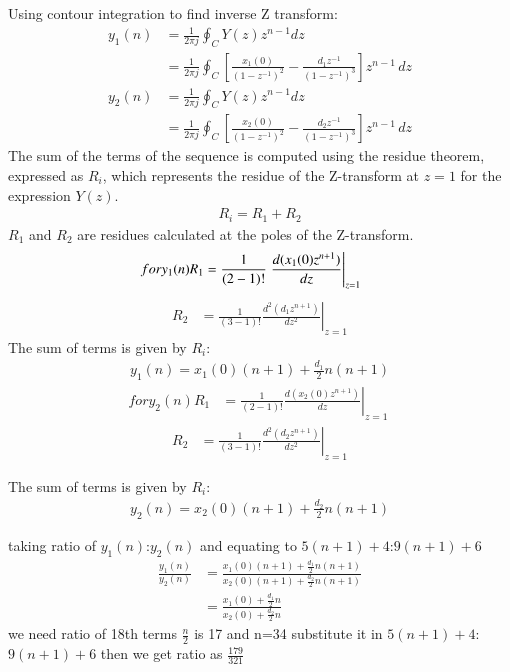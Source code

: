 \documentclass[journal,12pt,twocolumn]{IEEEtran}
\theoremstyle{remark}
\begin{document}
Using contour integration to find inverse Z transform:
\begin{align}
	y_1(n) &= \frac{1}{2\pi j} \oint_C Y(z) z^{n-1} dz\\
	&= \frac{1}{2\pi j} \oint_C \left[ \frac{x_1(0)}{(1-z^{-1})^2} - \frac{d_1z^{-1}}{(1-z^{-1})^3} \right]z^{n-1} \, dz
 \end{align}
 \begin{align}
 y_2(n) &= \frac{1}{2\pi j} \oint_C Y(z) z^{n-1} dz\\
	&= \frac{1}{2\pi j} \oint_C \left[ \frac{x_2(0)}{(1-z^{-1})^2} - \frac{d_2z^{-1}}{(1-z^{-1})^3} \right]z^{n-1} \, dz
 \end{align}
 The sum of the terms of the sequence is computed using the residue theorem, expressed as $R_i$, which represents the residue of the Z-transform at $ z=1 $ for the expression $ Y(z) $.
\begin{align}
	R_i=R_1 + R_2
\end{align}
 $R_1$ and $R_2$ are residues calculated at the poles of the Z-transform.
\begin{align}
for  y_1(n)
\vspace{1cm}
R_1 &= \frac{1}{{(2-1)!}} \left. \frac{d (x_1(0)z^{n+1})}{dz} \right|_{z=1} \
\end{align}
\begin{align}
R_2&=\frac{1}{{(3-1)!}} \left. \frac{d^2(d_1z^{n+1})}{dz^2} \right|_{z=1} 
\end{align}
The sum of terms is given by $R_i$:
 \begin{align}
y_1(n)=x_1(0)(n+1)	+ \frac{d_1}{2} n(n+1) 
 \end{align}
\begin{align}
for y_2(n)
R_1& = \frac{1}{{(2-1)!}} \left. \frac{d (x_2(0)z^{n+1})}{dz} \right|_{z=1} \
\end{align}
\begin{align}
R_2&=\frac{1}{{(3-1)!}} \left. \frac{d^2(d_2z^{n+1})}{dz^2} \right|_{z=1} 
\end{align}

The sum of terms is given by $R_i$:
\begin{align}
 y_2(n)=x_2(0)(n+1)	+ \frac{d_2}{2} n(n+1) 
 \end{align}

taking ratio of $y_1(n)$:$y_2(n)$ and equating to $5(n+1)+4$:$9(n+1)+6$\\
\begin{align}
\frac{y_1(n)}{y_2(n)}&=\frac{x_1(0)(n+1)+ \frac{d_1}{2} n(n+1)}{x_2(0)(n+1)+ \frac{d_2}{2} n(n+1)}\\
&=\frac{x_1(0)+\frac{d_1}{2}{n}}{x_2(0)+\frac{d_2}{2}{n}}
\end{align}
we need ratio of 18th  terms $\frac{n}{2}$ is 17 and n=34 
substitute it in $5(n+1)+4$:$9(n+1)+6$ then we get ratio as $\frac{179}{321}
$


	

 
\end{document}
